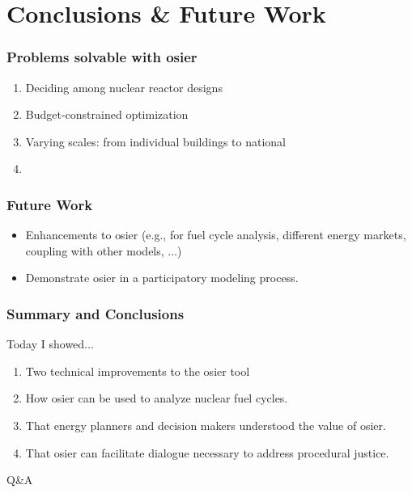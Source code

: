 \section{Conclusions \& Future Work}

\begin{frame}
    \frametitle{Problems solvable with \gls{osier}}

    \begin{enumerate}
        \item Deciding among nuclear reactor designs
        \item Budget-constrained optimization
        \item Varying scales: from individual buildings to national
        \item 
    \end{enumerate}

\end{frame}

\begin{frame}
    \frametitle{Future Work}

    \begin{itemize}
        \item Enhancements to \gls{osier} (e.g., for fuel cycle analysis, different energy markets, coupling with
        other models, ...)
        \item Demonstrate \gls{osier} in a participatory modeling process.
    \end{itemize}
\end{frame}


\begin{frame}
    \frametitle{Summary and Conclusions}
    Today I showed... 
    \begin{enumerate}
        \item Two technical improvements to the \gls{osier} tool
        \item How \gls{osier} can be used to analyze nuclear fuel cycles.
        \item That energy planners and decision makers understood the value of \gls{osier}.
        \item That \gls{osier} can facilitate dialogue necessary to address procedural justice.
    \end{enumerate}
\end{frame}


\begin{frame}

    Q\&A
    
\end{frame}